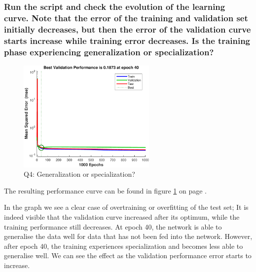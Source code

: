 \documentclass[12pt, a4paper]{article}
\begin{document}
\subsubsection{Run the script and check the evolution of the learning curve. Note that the error of the training and validation set initially decreases, but then the error of the validation curve starts increase while training error decreases. Is the training phase experiencing generalization or specialization?}
\begin{figure}[htbp]
	\centering
	\includegraphics[width=0.6\textwidth]{Q4}
	\caption{Q4: Generalization or specialization?}
	\label{Q4}
\end{figure}
The resulting performance curve can be found in figure \ref{Q4} on page \pageref{Q4}. 

In the graph we see a clear case of overtraining or overfitting of the test set; It is indeed visible that the validation curve increased after its optimum, while the training performance still decreases. At epoch 40, the network is able to generalise the data well for data that has not been fed into the network. However, after epoch 40, the training experiences specialization and becomes less able to generalise well. We can see the effect as the validation performance error starts to increase.
\end{document}
